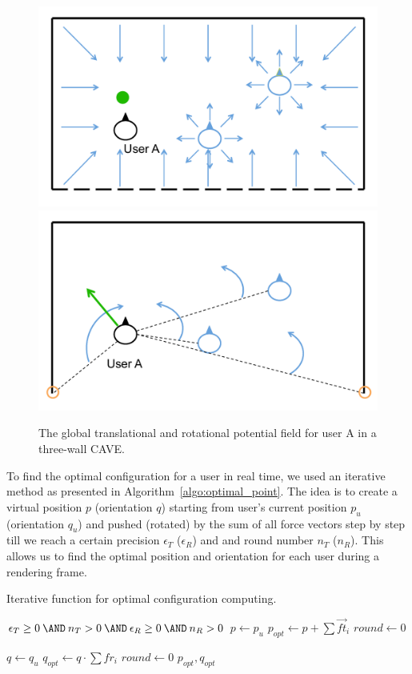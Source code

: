 \begin{figure}[htb]
  \centering
  \includegraphics[width=.49\textwidth]{figures/ch5/pf_t_total}
  \includegraphics[width=.49\textwidth]{figures/ch5/pf_r_total}
  \caption{\label{fig:5_pf_total}The global translational and rotational potential field for user A in a three-wall CAVE.}
\end{figure}


To find the optimal configuration for a user in real time, we used an iterative method as presented in Algorithm~\ref{algo:optimal_point}. The idea is to create a virtual position $p$ (orientation $q$) starting from user's current position $p_{u}$ (orientation $q_{u}$) and pushed (rotated) by the sum of all force vectors step by step till we reach a certain precision $\epsilon_{T}$ ($\epsilon_{R}$) and and round number $n_{T}$ ($n_{R}$). This allows us to find the optimal position and orientation for each user during a rendering frame.

\begin{algorithm}[htb]
\caption{Iterative function for optimal configuration computing.}
\label{algo:optimal_point}
\begin{algorithmic}
\REQUIRE $\epsilon_{T} \geq 0 \: \AND \: n_{T}>0 \: \AND \: \epsilon_{R} \geq 0 \: \AND \: n_{R}>0$
\STATE $p \leftarrow p_{u}$
\STATE $p_{opt} \leftarrow p+\sum \overrightarrow{ft}_{i}$
\STATE $round \leftarrow 0$
\ENDWHILE

\STATE $q \leftarrow q_{u}$
\STATE $q_{opt} \leftarrow q \cdot \sum fr_{i}$
\STATE $round \leftarrow 0$
\ENDWHILE
\RETURN $p_{opt}, q_{opt}$
\end{algorithmic}
\end{algorithm}


